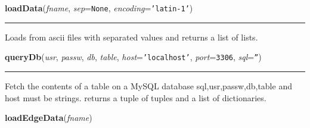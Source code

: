     \label{Epigrass:data_io:loadData}

    \vspace{0.5ex}

    \begin{boxedminipage}{\textwidth}

    \raggedright \textbf{loadData}(\textit{fname}, \textit{sep}=\texttt{None}, \textit{encoding}=\texttt{'latin-1'})

    \vspace{-1.5ex}

    \rule{\textwidth}{0.5\fboxrule}
    Loads from ascii files with separated values and returns a list of 
    lists.

    \vspace{1ex}

    \end{boxedminipage}

    \label{Epigrass:data_io:queryDb}

    \vspace{0.5ex}

    \begin{boxedminipage}{\textwidth}

    \raggedright \textbf{queryDb}(\textit{usr}, \textit{passw}, \textit{db}, \textit{table}, \textit{host}=\texttt{'localhost'}, \textit{port}=\texttt{3306}, \textit{sql}=\texttt{''})

    \vspace{-1.5ex}

    \rule{\textwidth}{0.5\fboxrule}
    Fetch the contents of a table on a MySQL database 
    sql,usr,passw,db,table and host must be strings. returns a tuple of 
    tuples and a list of dictionaries.

    \vspace{1ex}

    \end{boxedminipage}

    \label{Epigrass:data_io:loadEdgeData}

    \vspace{0.5ex}

    \begin{boxedminipage}{\textwidth}

    \raggedright \textbf{loadEdgeData}(\textit{fname})

    \end{boxedminipage}

